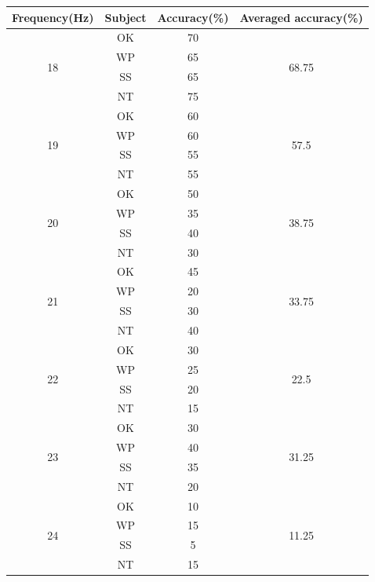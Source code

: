 \begin{table}[ht]
\centering
\begin{tabular}{| c | c | c | c |}   

            \hline 
            \textbf{Frequency(Hz)}&\textbf{Subject}&\textbf{Accuracy(\%)}&\textbf{Averaged accuracy(\%)}\\
            \hline
            \multirow{4}{*}{18}&OK&70&\multirow{4}{*}{68.75} \\
			\cline{2-3}
			&WP&65& \\ \cline{2-3}
			&SS&65& \\ \cline{2-3}
			&NT&75& \\
            \hline
            \multirow{4}{*}{19}&OK&60&\multirow{4}{*}{57.5} \\
			\cline{2-3}
			&WP&60& \\ \cline{2-3}
			&SS&55& \\ \cline{2-3}
			&NT&55& \\
            \hline
            \multirow{4}{*}{20}&OK&50&\multirow{4}{*}{38.75} \\
			\cline{2-3}
			&WP&35& \\ \cline{2-3}
			&SS&40& \\ \cline{2-3}
			&NT&30& \\
            \hline
            \multirow{4}{*}{21}&OK&45&\multirow{4}{*}{33.75} \\
			\cline{2-3}
			&WP&20& \\ \cline{2-3}
			&SS&30& \\ \cline{2-3}
			&NT&40& \\
            \hline
            \multirow{4}{*}{22}&OK&30&\multirow{4}{*}{22.5} \\
			\cline{2-3}
			&WP&25& \\ \cline{2-3}
			&SS&20& \\ \cline{2-3}
			&NT&15& \\
            \hline
            \multirow{4}{*}{23}&OK&30&\multirow{4}{*}{31.25} \\
			\cline{2-3}
			&WP&40& \\ \cline{2-3}
			&SS&35& \\ \cline{2-3}
			&NT&20& \\
            \hline
            \multirow{4}{*}{24}&OK&10&\multirow{4}{*}{11.25} \\
			\cline{2-3}
			&WP&15& \\ \cline{2-3}
			&SS&5& \\ \cline{2-3}
			&NT&15& \\

\end{tabular}
\end{table}
